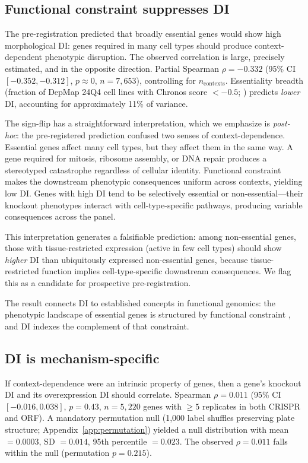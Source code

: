 \documentclass[11pt]{article}
\begin{document}
\subsection{Functional constraint suppresses DI}

The pre-registration predicted that broadly essential genes would show
high morphological DI: genes required in many cell types should produce
context-dependent phenotypic disruption.  The observed correlation is
large, precisely estimated, and in the opposite direction.  Partial
Spearman $\rho = -0.332$ (95\% CI $[-0.352, -0.312]$, $p \approx 0$,
$n = 7{,}653$), controlling for $n_{\mathrm{contexts}}$.  Essentiality
breadth (fraction of DepMap 24Q4 cell lines with Chronos score
$< -0.5$; \citealp{funk2022phenotypic}) predicts \emph{lower} DI,
accounting for approximately 11\% of variance.

The sign-flip has a straightforward interpretation, which we emphasize
is \emph{post-hoc}: the pre-registered prediction confused two senses
of context-dependence.  Essential genes affect many cell types, but they
affect them in the same way.  A gene required for mitosis, ribosome
assembly, or DNA repair produces a stereotyped catastrophe regardless of
cellular identity.  Functional constraint makes the downstream
phenotypic consequences uniform across contexts, yielding low DI.  Genes
with high DI tend to be selectively essential or non-essential---their
knockout phenotypes interact with cell-type-specific pathways,
producing variable consequences across the panel.

This interpretation generates a falsifiable prediction: among
non-essential genes, those with tissue-restricted expression (active in
few cell types) should show \emph{higher} DI than ubiquitously expressed
non-essential genes, because tissue-restricted function implies
cell-type-specific downstream consequences.  We flag this as a candidate
for prospective pre-registration.

The result connects DI to established concepts in functional genomics:
the phenotypic landscape of essential genes is structured by functional
constraint \citep{funk2022phenotypic, ramezani2025periscope}, and DI
indexes the complement of that constraint.


\subsection{DI is mechanism-specific}

If context-dependence were an intrinsic property of genes, then a
gene's knockout DI and its overexpression DI should correlate.
Spearman $\rho = 0.011$ (95\% CI $[-0.016, 0.038]$, $p = 0.43$,
$n = 5{,}220$ genes with $\geq 5$ replicates in both CRISPR and ORF).
A mandatory permutation null (1{,}000 label shuffles preserving plate
structure; Appendix~\ref{app:permutation}) yielded a null distribution
with mean $= 0.0003$, SD $= 0.014$, 95th percentile $= 0.023$.  The
observed $\rho = 0.011$ falls within the null (permutation
$p = 0.215$).
\end{document}
